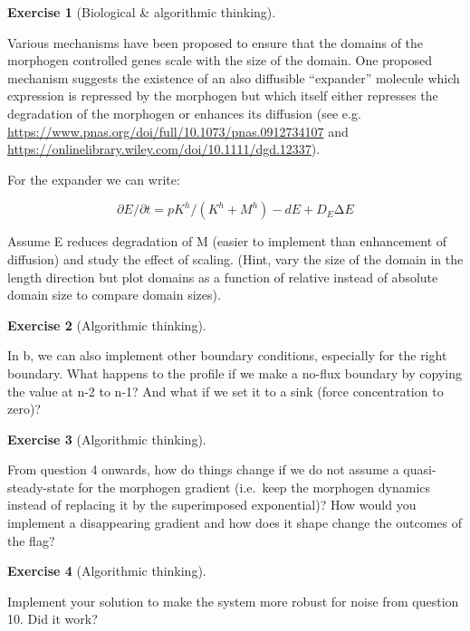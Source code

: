 \documentclass[
  letterpaper,
  DIV=11,
  numbers=noendperiod]{scrreprt}
\theoremstyle{definition}
\newtheorem{exercise}{Exercise}[chapter]
\theoremstyle{remark}
\begin{document}
\begin{exercise}[Biological \& algorithmic
thinking]\protect\hypertarget{exr-plain}{}\label{exr-plain}

Various mechanisms have been proposed to ensure that the domains of the
morphogen controlled genes scale with the size of the domain. One
proposed mechanism suggests the existence of an also diffusible
``expander'' molecule which expression is repressed by the morphogen but
which itself either represses the degradation of the morphogen or
enhances its diffusion (see e.g.
\url{https://www.pnas.org/doi/full/10.1073/pnas.0912734107} and
\url{https://onlinelibrary.wiley.com/doi/10.1111/dgd.12337}).

For the expander we can write:

\[
∂E/∂t=p K^h/(K^h+M^h )-dE+D_E ∆E
\]

Assume E reduces degradation of M (easier to implement than enhancement
of diffusion) and study the effect of scaling. (Hint, vary the size of
the domain in the length direction but plot domains as a function of
relative instead of absolute domain size to compare domain sizes).

\end{exercise}

\begin{exercise}[Algorithmic
thinking]\protect\hypertarget{exr-plain}{}\label{exr-plain}

In b, we can also implement other boundary conditions, especially for
the right boundary. What happens to the profile if we make a no-flux
boundary by copying the value at n-2 to n-1? And what if we set it to a
sink (force concentration to zero)?

\end{exercise}

\begin{exercise}[Algorithmic
thinking]\protect\hypertarget{exr-plain}{}\label{exr-plain}

From question 4 onwards, how do things change if we do not assume a
quasi-steady-state for the morphogen gradient (i.e.~keep the morphogen
dynamics instead of replacing it by the superimposed exponential)? How
would you implement a disappearing gradient and how does it shape change
the outcomes of the flag?

\end{exercise}

\begin{exercise}[Algorithmic
thinking]\protect\hypertarget{exr-plain}{}\label{exr-plain}

Implement your solution to make the system more robust for noise from
question 10. Did it work?

\end{exercise}
\end{document}
